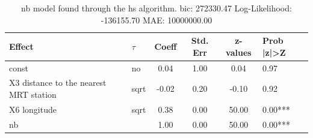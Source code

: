 \begin{table}
	\caption{nb model found through the hs algorithm. bic: 272330.47 Log-Likelihood: -136155.70 MAE: 10000000.00}
	\begin{center}
		\begin{tabular}{|l|l|c|c|c|l|}
			\hline
			Effect & $\tau$ & Coeff & Std. Err & z-values & Prob |z|>Z \\
			\hline
			const & no & 0.04 & 1.00 & 0.04 & 0.97 \\
			\hline
			X3 distance to the nearest MRT station & sqrt & -0.02 & 0.20 & -0.10 & 0.92 \\
			\hline
			X6 longitude & sqrt & 0.38 & 0.00 & 50.00 & 0.00*** \\
			\hline
			nb &  & 1.00 & 0.00 & 50.00 & 0.00*** \\
			\hline
		\end{tabular}
	\end{center}
\end{table}